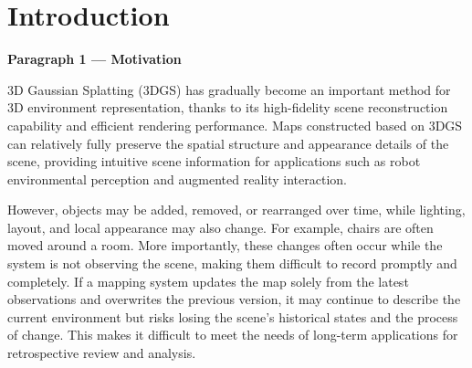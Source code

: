\section{Introduction}









\textbf{Paragraph 1 — Motivation}

3D Gaussian Splatting (3DGS) has gradually become an important method for 3D environment representation, thanks to its high-fidelity scene reconstruction capability and efficient rendering performance. Maps constructed based on 3DGS can relatively fully preserve the spatial structure and appearance details of the scene, providing intuitive scene information for applications such as robot environmental perception and augmented reality interaction.

However, objects may be added, removed, or rearranged over time, while lighting, layout, and local appearance may also change. For example, chairs are often moved around a room. More importantly, these changes often occur while the system is not observing the scene, making them difficult to record promptly and completely. If a mapping system updates the map solely from the latest observations and overwrites the previous version, it may continue to describe the current environment but risks losing the scene’s historical states and the process of change. This makes it difficult to meet the needs of long-term applications for retrospective review and analysis.

